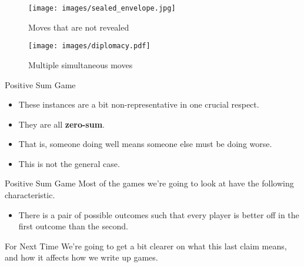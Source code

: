 \documentclass[
  ignorenonframetext,
]{beamer}
\providecommand{\tightlist}{%
  \setlength{\itemsep}{0pt}\setlength{\parskip}{0pt}}
\begin{document}
\begin{frame}
\begin{figure}
\centering
\texttt{[image: images/sealed\_envelope.jpg]}
\caption{Moves that are not revealed}
\end{figure}
\end{frame}

\begin{frame}
\begin{figure}
\centering
\texttt{[image: images/diplomacy.pdf]}
\caption{Multiple simultaneous moves}
\end{figure}
\end{frame}

\begin{frame}{Positive Sum Game}
\protect\hypertarget{positive-sum-game}{}
\begin{itemize}
\tightlist
\item
  These instances are a bit non-representative in one crucial respect.
\item
  They are all \textbf{zero-sum}.
\item
  That is, someone doing well means someone else must be doing worse.
\item
  This is not the general case.
\end{itemize}
\end{frame}

\begin{frame}{Positive Sum Game}
\protect\hypertarget{positive-sum-game-1}{}
Most of the games we're going to look at have the following
characteristic.

\begin{itemize}
\tightlist
\item
  There is a pair of possible outcomes such that every player is better
  off in the first outcome than the second.
\end{itemize}
\end{frame}

\begin{frame}{For Next Time}
\protect\hypertarget{for-next-time}{}
We're going to get a bit clearer on what this last claim means, and how
it affects how we write up games.
\end{frame}
\end{document}
